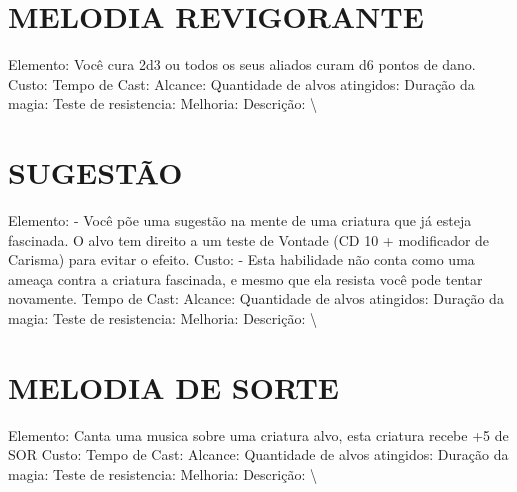 \documentclass{article}%
\begin{document}
%
\section{MELODIA REVIGORANTE}%
\label{sec:MELODIAREVIGORANTE}%
Elemento: Você cura 2d3 ou todos os seus aliados curam d6 pontos de dano.\newline%
Custo: \newline%
Tempo de Cast: \newline%
Alcance: \newline%
Quantidade de alvos atingidos: \newline%
Duração da magia: \newline%
Teste de resistencia: \newline%
Melhoria: \newline%
Descrição: \textbackslash{}

%
\section{SUGESTÃO}%
\label{sec:SUGESTO}%
Elemento: {-} Você põe uma sugestão na mente de uma criatura que já esteja fascinada. O alvo tem direito a um teste de Vontade (CD 10 + modificador de Carisma) para evitar o efeito.\newline%
Custo:   {-} Esta habilidade não conta como uma ameaça contra a criatura fascinada, e mesmo que ela resista você pode tentar novamente.\newline%
Tempo de Cast: \newline%
Alcance: \newline%
Quantidade de alvos atingidos: \newline%
Duração da magia: \newline%
Teste de resistencia: \newline%
Melhoria: \newline%
Descrição: \textbackslash{}

%
\section{MELODIA DE SORTE}%
\label{sec:MELODIADESORTE}%
Elemento: Canta uma musica sobre uma criatura alvo, esta criatura recebe +5 de SOR\newline%
Custo: \newline%
Tempo de Cast: \newline%
Alcance: \newline%
Quantidade de alvos atingidos: \newline%
Duração da magia: \newline%
Teste de resistencia: \newline%
Melhoria: \newline%
Descrição: \textbackslash{}
\end{document}
